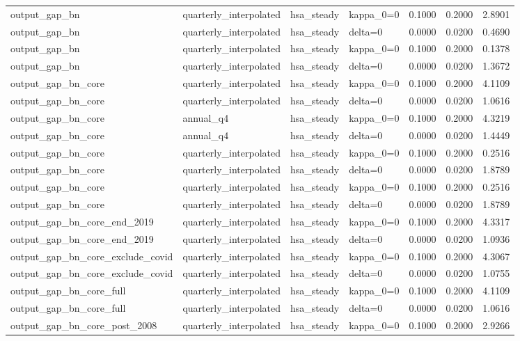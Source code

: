 \begin{tabular}{llllrrr}
output\_gap\_bn & quarterly\_interpolated & hsa\_steady & kappa\_0=0 & 0.1000 & 0.2000 & 2.8901 \\
output\_gap\_bn & quarterly\_interpolated & hsa\_steady & delta=0 & 0.0000 & 0.0200 & 0.4690 \\
output\_gap\_bn & quarterly\_interpolated & hsa\_steady & kappa\_0=0 & 0.1000 & 0.2000 & 0.1378 \\
output\_gap\_bn & quarterly\_interpolated & hsa\_steady & delta=0 & 0.0000 & 0.0200 & 1.3672 \\
output\_gap\_bn\_core & quarterly\_interpolated & hsa\_steady & kappa\_0=0 & 0.1000 & 0.2000 & 4.1109 \\
output\_gap\_bn\_core & quarterly\_interpolated & hsa\_steady & delta=0 & 0.0000 & 0.0200 & 1.0616 \\
output\_gap\_bn\_core & annual\_q4 & hsa\_steady & kappa\_0=0 & 0.1000 & 0.2000 & 4.3219 \\
output\_gap\_bn\_core & annual\_q4 & hsa\_steady & delta=0 & 0.0000 & 0.0200 & 1.4449 \\
output\_gap\_bn\_core & quarterly\_interpolated & hsa\_steady & kappa\_0=0 & 0.1000 & 0.2000 & 0.2516 \\
output\_gap\_bn\_core & quarterly\_interpolated & hsa\_steady & delta=0 & 0.0000 & 0.0200 & 1.8789 \\
output\_gap\_bn\_core & quarterly\_interpolated & hsa\_steady & kappa\_0=0 & 0.1000 & 0.2000 & 0.2516 \\
output\_gap\_bn\_core & quarterly\_interpolated & hsa\_steady & delta=0 & 0.0000 & 0.0200 & 1.8789 \\
output\_gap\_bn\_core\_end\_2019 & quarterly\_interpolated & hsa\_steady & kappa\_0=0 & 0.1000 & 0.2000 & 4.3317 \\
output\_gap\_bn\_core\_end\_2019 & quarterly\_interpolated & hsa\_steady & delta=0 & 0.0000 & 0.0200 & 1.0936 \\
output\_gap\_bn\_core\_exclude\_covid & quarterly\_interpolated & hsa\_steady & kappa\_0=0 & 0.1000 & 0.2000 & 4.3067 \\
output\_gap\_bn\_core\_exclude\_covid & quarterly\_interpolated & hsa\_steady & delta=0 & 0.0000 & 0.0200 & 1.0755 \\
output\_gap\_bn\_core\_full & quarterly\_interpolated & hsa\_steady & kappa\_0=0 & 0.1000 & 0.2000 & 4.1109 \\
output\_gap\_bn\_core\_full & quarterly\_interpolated & hsa\_steady & delta=0 & 0.0000 & 0.0200 & 1.0616 \\
output\_gap\_bn\_core\_post\_2008 & quarterly\_interpolated & hsa\_steady & kappa\_0=0 & 0.1000 & 0.2000 & 2.9266 \\

\end{tabular}

